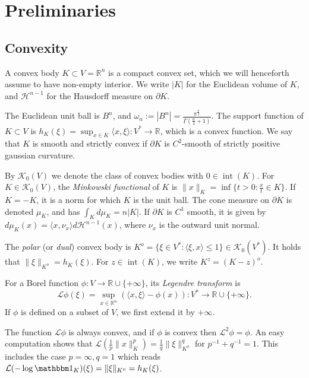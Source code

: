 \documentclass[reqno,10pt]{amsart}
\newcounter{mp}
\DeclareMathOperator{\inter}{int}
\newcommand{\R}{\mathbb{R}}
\begin{document}
\section{Preliminaries}\label{sec:preliminaries}

\subsection{Convexity}
A convex body $K\subset V=\R^n$ is a compact convex set, which we will henceforth assume to have non-empty interior. We write $|K|$ for the Euclidean volume of $K$, and $\mathcal H^{n-1}$ for the Hausdorff measure on $\partial K$.

The Euclidean unit ball is $B^n$, and $\omega_n:=|B^n|=\frac{\pi^{\frac n 2}}{\Gamma(\frac n 2 +1)}$. The support function of $K\subset V$ is $h_K(\xi)=\sup_{x\in K}\langle x,\xi\rangle:V^*\to \R$, which is a convex function. 
We say that $K$ is smooth and strictly convex if $\partial K$ is $C^2$-smooth of strictly positive gaussian curvature.

By $\mathcal K_0(V)$ we denote the class of convex bodies with $0\in\inter(K)$. For $K\in\mathcal K_0(V)$, the \emph{Minkowski functional} of $K$ is $\|x\|_K=\inf\{t>0: \frac{x}{t}\in K\}$. If $K=-K$, it is a norm for which $K$ is the unit ball. 
 The cone measure on $\partial K$ is denoted $\mu_K$, and has $\int_K d\mu_K=n|K|$. If $\partial K$ is $C^1$ smooth, it is given by $d\mu_K(x)=\langle x, \nu_x\rangle d\mathcal H^{n-1}(x)$, where $\nu_x$ is the outward unit normal.	

The \emph{polar} (or \emph{dual}) convex body is $K^o=\{\xi\in V^*: \langle \xi,x\rangle\leq 1\}\in\mathcal K_0(V^*)$. It holds that $\|\xi\|_{K^o}=h_K(\xi)$.
For $z\in \inter(K)$, we write $K^z=(K-z)^o$.

For a Borel function $\phi:V\to \R\cup\{+\infty\}$, its \emph{Legendre transform} is \begin{equation}\label{eq:legendre}\mathcal L\phi(\xi)=\sup_{x\in\R^n} (\langle x,\xi\rangle -\phi(x)): V^*\to \mathbb R\cup\{+\infty\}.
\end{equation}
If $\phi$ is defined on a subset of $V$, we first extend it by $+\infty$.

The function $\mathcal L\phi$ is always convex, and if $\phi$ is convex then $\mathcal L^2\phi=\phi$.
An easy computation shows that $\mathcal L(\frac1p\|x\|_K^p)=\frac1q\|\xi\|_{K^o}^q$ for  $p^{-1}+q^{-1}=1$. This includes the case $p=\infty, q=1$ which reads $\mathcal L(-\log \mathbbm 1_K)(\xi)=\|\xi\|_{K^o}=h_K(\xi)$.
\end{document}
